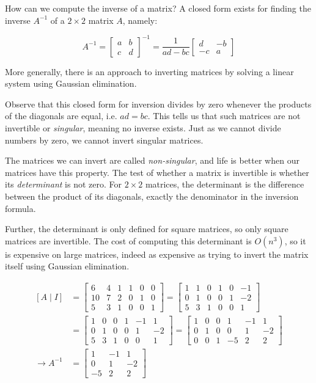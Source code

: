 \documentclass[10pt]{article}
\begin{document}
How can we compute the inverse of a matrix? A closed form exists for finding the inverse \(A^{-1}\) of a \(2 \times 2\) matrix \(A\), namely:

\[
A^{-1} = \begin{bmatrix}
a & b \\
c & d
\end{bmatrix}^{-1} = \frac{1}{ad-bc}\begin{bmatrix}
d & -b \\
-c & a
\end{bmatrix}
\]

More generally, there is an approach to inverting matrices by solving a linear system using Gaussian elimination.

Observe that this closed form for inversion divides by zero whenever the products of the diagonals are equal, i.e. \(ad=bc\). This tells us that such matrices are not invertible or \textit{singular}, meaning no inverse exists. Just as we cannot divide numbers by zero, we cannot invert singular matrices.

The matrices we can invert are called \textit{non-singular}, and life is better when our matrices have this property. The test of whether a matrix is invertible is whether its \textit{determinant} is not zero. For \(2 \times 2\) matrices, the determinant is the difference between the product of its diagonals, exactly the denominator in the inversion formula.

Further, the determinant is only defined for square matrices, so only square matrices are invertible. The cost of computing this determinant is \(O(n^{3})\), so it is expensive on large matrices, indeed as expensive as trying to invert the matrix itself using Gaussian elimination.

\[
\begin{aligned}
\left[A \mid I\right] & =\begin{bmatrix} 6 & 4 & 1 & 1 & 0 & 0 \\ 10 & 7 & 2 & 0 & 1 & 0 \\ 5 & 3 & 1 & 0 & 0 & 1 \end{bmatrix}=\begin{bmatrix} 1 & 1 & 0 & 1 & 0 & -1 \\ 0 & 1 & 0 & 0 & 1 & -2 \\ 5 & 3 & 1 & 0 & 0 & 1 \end{bmatrix} \\
& =\begin{bmatrix} 1 & 0 & 0 & 1 & -1 & 1 \\ 0 & 1 & 0 & 0 & 1 & -2 \\ 5 & 3 & 1 & 0 & 0 & 1 \end{bmatrix}=\begin{bmatrix} 1 & 0 & 0 & 1 & -1 & 1 \\ 0 & 1 & 0 & 0 & 1 & -2 \\ 0 & 0 & 1 & -5 & 2 & 2 \end{bmatrix} \\
\rightarrow A^{-1} & =\begin{bmatrix} 1 & -1 & 1 \\ 0 & 1 & -2 \\ -5 & 2 & 2 \end{bmatrix}
\end{aligned}
\]
\end{document}
